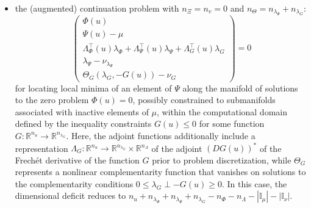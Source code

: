 \begin{itemize}
\item the (augmented) continuation problem with $n_\Xi=n_v=0$ and $n_\Theta=n_{\lambda_\Psi}+n_{\lambda_G}$:
\begin{equation}
\label{eq:inequality}
\left(\begin{array}{c}\Phi(u)\\\Psi(u)-\mu\\\Lambda_\Phi^\top(u)\lambda_\Phi+\Lambda_\Psi^\top(u)\lambda_\Psi+\Lambda_G^\top(u)\lambda_G\\\lambda_\Psi-\nu_{\lambda_\Psi}\\\Theta_G(\lambda_G,-G(u))-\nu_G\end{array}\right)=0
\end{equation}
for locating local minima of an element of $\Psi$ along the manifold of solutions to the zero problem $\Phi(u)=0$, possibly constrained to submanifolds associated with inactive elements of $\mu$, within the computational domain defined by the inequality constraints $G(u)\le 0$ for some function $G:\mathbb{R}^{n_u}\rightarrow\mathbb{R}^{n_{\lambda_G}}$. Here, the adjoint functions additionally include a representation $\Lambda_G:\mathbb{R}^{n_u}\rightarrow\mathbb{R}^{n_{\lambda_G}}\times\mathbb{R}^{n_\Lambda}$ of the adjoint $\left(DG(u)\right)^\ast$ of the Frech\'{e}t derivative of the function $G$ prior to problem discretization, while $\Theta_G$ represents a nonlinear complementarity function that vanishes on solutions to the complementarity conditions $0\le \lambda_G\perp -G(u)\ge 0$. In this case, the dimensional deficit reduces to $n_u+n_{\lambda_\Phi}+n_{\lambda_\Psi}+n_{\lambda_G}-n_\Phi-n_\Lambda-\left|\mathbb{I}_\mu\right|-\left|\mathbb{I}_\nu\right|$.

\end{itemize}

